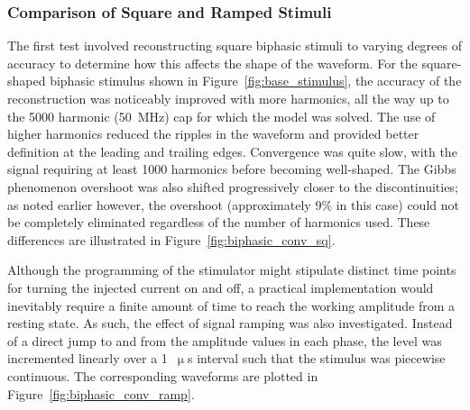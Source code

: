 \subsubsection{Comparison of Square and Ramped Stimuli}

The first test involved reconstructing square biphasic stimuli to varying
degrees of accuracy to determine how this affects the shape of the waveform. For
the square-shaped biphasic stimulus shown in Figure~\ref{fig:base_stimulus}, the
accuracy of the reconstruction was noticeably improved with more harmonics, all
the way up to the 5000 harmonic (50~MHz) cap for which the model was solved. The
use of higher harmonics reduced the ripples in the waveform and provided better
definition at the leading and trailing edges. Convergence was quite slow, with
the signal requiring at least 1000 harmonics before becoming well-shaped. The
Gibbs phenomenon overshoot was also shifted progressively closer to the
discontinuities; as noted earlier however, the overshoot (approximately 9\% in
this case) could not be completely eliminated regardless of the number of
harmonics used. These differences are illustrated in
Figure~\ref{fig:biphasic_conv_sq}.

Although the programming of the stimulator might stipulate distinct time points
for turning the injected current on and off, a practical implementation would
inevitably require a finite amount of time to reach the working amplitude from a
resting state. As such, the effect of signal ramping was also investigated.
Instead of a direct jump to and from the amplitude values in each phase, the
level was incremented linearly over a 1~$ \upmu $s interval such that the
stimulus was piecewise continuous. The corresponding waveforms are plotted in
Figure~\ref{fig:biphasic_conv_ramp}.

